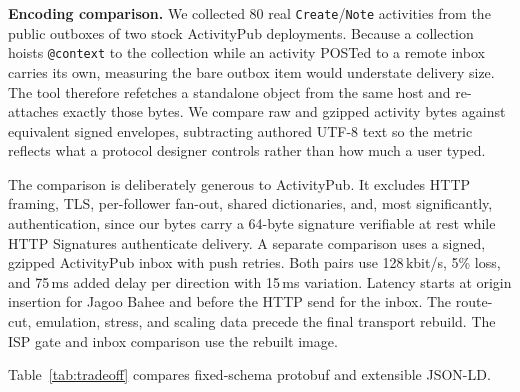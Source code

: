 \documentclass[conference,a4paper,10pt]{IEEEtran}
\begin{document}
\textbf{Encoding comparison.} We collected 80 real
\texttt{Create}/\texttt{Note} activities from the public outboxes of two stock ActivityPub \cite{activitypub} deployments. Because a collection hoists \texttt{@context} to the
collection while an activity POSTed to a remote inbox carries its own,
measuring the bare outbox item would understate delivery size. The tool
therefore refetches a standalone object from the same host and re-attaches
exactly those bytes. We compare raw and gzipped activity bytes against
equivalent signed envelopes, subtracting authored UTF-8 text so the metric
reflects what a protocol designer controls rather than how much a user typed.

The comparison is deliberately generous to ActivityPub. It excludes HTTP
framing, TLS, per-follower fan-out, shared dictionaries, and, most significantly, authentication, since our bytes carry a 64-byte signature
verifiable at rest while HTTP Signatures authenticate delivery. A separate comparison uses a signed, gzipped ActivityPub inbox with push retries. Both pairs use 128\,kbit/s, 5\% loss, and 75\,ms added delay per direction with 15\,ms variation. Latency starts at origin insertion for Jagoo Bahee and before the HTTP send for the inbox. The route-cut, emulation, stress, and scaling data precede the final transport rebuild. The ISP gate and inbox comparison use the rebuilt image.

Table~\ref{tab:tradeoff} compares fixed-schema protobuf and extensible JSON-LD.
\end{document}

